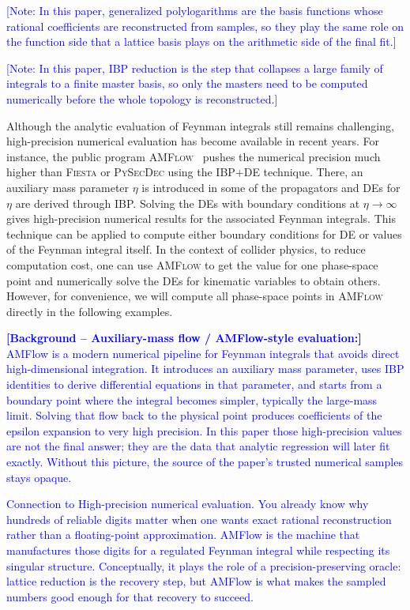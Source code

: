 \documentclass[a4paper,11pt]{article}
\makeatletter
\def\textcolor#1#{\kg@textcolor{#1}}
\makeatother
\begin{document}
\textcolor{blue}{\small [Note: In this paper, generalized polylogarithms are the basis functions whose rational coefficients are reconstructed from samples, so they play the same role on the function side that a lattice basis plays on the arithmetic side of the final fit.]}

\textcolor{blue}{\small [Note: In this paper, IBP reduction is the step that collapses a large family of integrals to a finite master basis, so only the masters need to be computed numerically before the whole topology is reconstructed.]}


Although the analytic evaluation of Feynman integrals still remains challenging, high-precision numerical evaluation has become available in recent years.
For instance, the public program \textsc{AMFlow}~\cite{Liu:2017jxz, Liu:2018dmc, Liu:2021wks,Liu:2022chg, Liu:2022mfb} pushes the numerical precision much higher than \textsc{Fiesta} or \textsc{PySecDec} using the IBP+DE technique. There, an auxiliary mass parameter $\eta$ is introduced in some of the propagators and DEs for $\eta$ are derived through IBP. Solving the DEs with boundary conditions at $\eta\to\infty$ gives high-precision numerical results for the associated Feynman integrals. This technique can be applied to compute either boundary conditions for DE or values of the Feynman integral itself. In the context of collider physics, to reduce computation cost, one can use \textsc{AMFlow} to get the value for one phase-space point and numerically solve the DEs for kinematic variables to obtain others. However, for convenience, we will compute all phase-space points in \textsc{AMFlow} directly in the following examples.
\textcolor{blue}{\small\textbf{[Background -- Auxiliary-mass flow / AMFlow-style evaluation:]} AMFlow is a modern numerical pipeline for Feynman integrals that avoids direct high-dimensional integration. It introduces an auxiliary mass parameter, uses IBP identities to derive differential equations in that parameter, and starts from a boundary point where the integral becomes simpler, typically the large-mass limit. Solving that flow back to the physical point produces coefficients of the epsilon expansion to very high precision. In this paper those high-precision values are not the final answer; they are the data that analytic regression will later fit exactly. Without this picture, the source of the paper's trusted numerical samples stays opaque.\par Connection to High-precision numerical evaluation. You already know why hundreds of reliable digits matter when one wants exact rational reconstruction rather than a floating-point approximation. AMFlow is the machine that manufactures those digits for a regulated Feynman integral while respecting its singular structure. Conceptually, it plays the role of a precision-preserving oracle: lattice reduction is the recovery step, but AMFlow is what makes the sampled numbers good enough for that recovery to succeed.}
\end{document}
